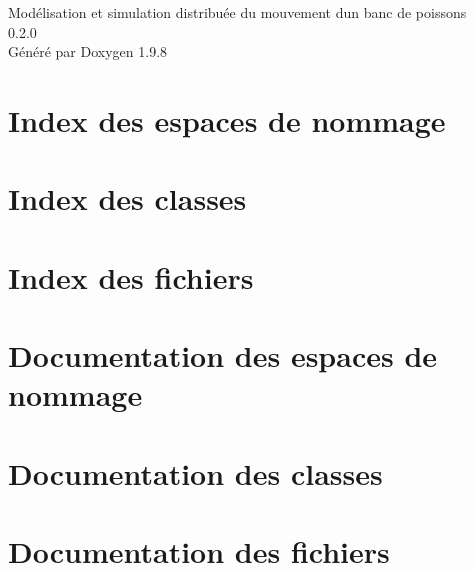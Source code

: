 \documentclass[twoside]{book}
\newcommand{\+}{\discretionary{\mbox{\scriptsize$\hookleftarrow$}}{}{}}
\newcommand{\clearemptydoublepage}{%
    \newpage{\pagestyle{empty}\cleardoublepage}%
  }
\begin{document}
  \raggedbottom
    \hypersetup{pageanchor=false,
                bookmarksnumbered=true,
                pdfencoding=unicode
               }
  \begin{titlepage}
  \vspace*{7cm}
  \begin{center}%
  {\Large Modélisation et simulation distribuée du mouvement d\textquotesingle{}un banc de poissons}\\
  [1ex]\large 0.\+2.\+0 \\
  \vspace*{1cm}
  {\large Généré par Doxygen 1.9.8}\\
  \end{center}
  \end{titlepage}
  \clearemptydoublepage
  \tableofcontents
  \clearemptydoublepage
  \hypersetup{pageanchor=true}

\chapter{Index des espaces de nommage}

\chapter{Index des classes}

\chapter{Index des fichiers}

\chapter{Documentation des espaces de nommage}


\chapter{Documentation des classes}





\chapter{Documentation des fichiers}













  \backmatter
  \newpage
  \clearemptydoublepage
  \printindex
\end{document}
